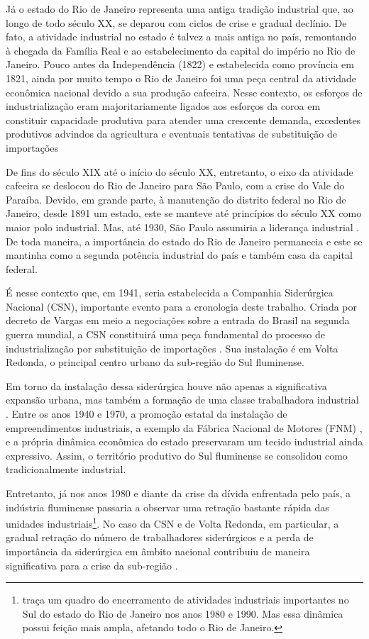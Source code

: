 Já o estado do Rio de Janeiro representa uma antiga tradição industrial
que, ao longo de todo século XX, se deparou com ciclos de crise e
gradual declínio. De fato, a atividade industrial no estado é talvez a
mais antiga no país, remontando à chegada da Família Real e ao
estabelecimento da capital do império no Rio de Janeiro. Pouco antes da
Independência (1822) e estabelecida como província em 1821, ainda por
muito tempo o Rio de Janeiro foi uma peça central da atividade econômica
nacional devido a sua produção cafeeira. Nesse contexto, os esforços de
industrialização eram majoritariamente ligados aos esforços da coroa em
constituir capacidade produtiva para atender uma crescente demanda,
excedentes produtivos advindos da agricultura e eventuais tentativas de
substituição de importações
\citep{barreto_o_2018}

De fins do século XIX até o início do século XX, entretanto, o eixo da
atividade cafeeira se deslocou do Rio de Janeiro para São Paulo, com a
crise do Vale do Paraíba. Devido, em grande parte, à manutenção do
distrito federal no Rio de Janeiro, desde 1891 um estado, este se
manteve até princípios do século XX como maior polo industrial. Mas, até
1930, São Paulo assumiria a liderança industrial
\citep{saes_industria_2014}.
De toda maneira, a importância do estado do Rio de Janeiro permanecia e
este se mantinha como a segunda potência industrial do país e também
casa da capital federal.

É nesse contexto que, em 1941, seria estabelecida a Companhia
Siderúrgica Nacional (CSN), importante evento para a cronologia deste
trabalho. Criada por decreto de Vargas em meio a negociações sobre a
entrada do Brasil na segunda guerra mundial, a CSN constituirá uma peça
fundamental do processo de industrialização por substituição de
importações \citep{ramalhosantoslima2013}. Sua instalação é em Volta Redonda, o principal
centro urbano da sub-região do Sul fluminense.

Em torno da instalação dessa siderúrgica houve não apenas a
significativa expansão urbana, mas também a formação de uma classe
trabalhadora industrial
\citep{morel1989}. Entre
os anos 1940 e 1970, a promoção estatal da instalação de empreendimentos
industriais, a exemplo da Fábrica Nacional de Motores (FNM)
\citep{ramalho1989}, e a
própria dinâmica econômica do estado preservaram um tecido industrial
ainda expressivo. Assim, o território produtivo do Sul fluminense se
consolidou como tradicionalmente industrial.

Entretanto, já nos anos 1980 e diante da crise da dívida enfrentada pelo
país, a indústria fluminense passaria a observar uma retração bastante
rápida das unidades industriais\footnote{\citet{santos2006} traça um
  quadro do encerramento de atividades industriais importantes no Sul do
  estado do Rio de Janeiro nos anos 1980 e 1990. Mas essa dinâmica
  possui feição mais ampla, afetando todo o Rio de Janeiro.}. No caso da
CSN e de Volta Redonda, em particular, a gradual retração do número de
trabalhadores siderúrgicos e a perda de importância da siderúrgica em
âmbito nacional contribuiu de maneira significativa para a crise da
sub-região \citep{ramalhosantoslima2013}.

